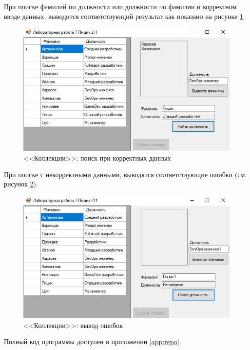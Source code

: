 При поиске фамилий по должности или должности по фамилии и корректном вводе данных, 
выводится соответствующий результат как показано на рисунке \ref{fig:cols_find}.
\begin{figure}[H]
  \centering
  \includegraphics[scale=.85]{../img/collections/collections_find.jpg}
  \caption{<<Коллекции>>: поиск при корректных данных}
  \label{fig:cols_find}
\end{figure}

При поиске с некорректными данными, выводятся соответствующие ошибки 
(см. рисунок \ref{fig:cols_error}).
\begin{figure}[H]
  \centering
  \includegraphics[scale=.85]{../img/collections/collections_error.jpg}
  \caption{<<Коллекции>>: вывод ошибок}
  \label{fig:cols_error}
\end{figure}

Полный код программы доступен в приложении \ref{app:repo}.